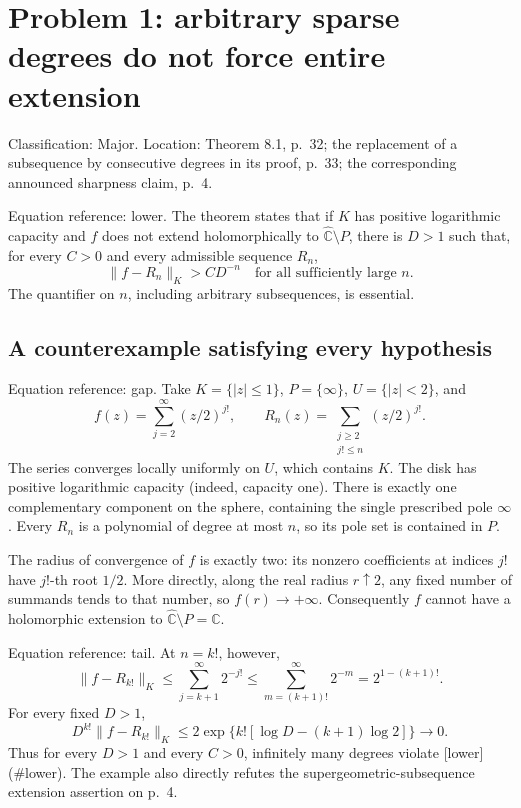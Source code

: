 \documentclass[10pt]{article}
\begin{document}
\section*{Problem 1: arbitrary sparse degrees do not force entire extension}
Classification: Major. Location: Theorem 8.1, p. 32; the replacement of a subsequence by consecutive degrees in its proof, p. 33; the corresponding announced sharpness claim, p. 4.\par
Equation reference: lower. The theorem states that if \(K\) has positive logarithmic capacity and \(f\) does not extend holomorphically to \(\widehat{\mathbb C}\setminus P\), there is \(D>1\) such that, for every \(C>0\) and every admissible sequence \(R_n\), \[
 \|f-R_n\|_K>C D^{-n}\quad\text{for all sufficiently large }n.\] The quantifier on \(n\), including arbitrary subsequences, is essential.\par
\subsection*{A counterexample satisfying every hypothesis}
Equation reference: gap. Take \(K=\{|z|\le1\}\), \(P=\{\infty\}\), \(U=\{|z|<2\}\), and \[
 f(z)=\sum_{j=2}^{\infty}(z/2)^{j!},\qquad
 R_n(z)=\sum_{\substack{j\ge2\\ j!\le n}}(z/2)^{j!}.\] The series converges locally uniformly on \(U\), which contains \(K\). The disk has positive logarithmic capacity (indeed, capacity one). There is exactly one complementary component on the sphere, containing the single prescribed pole \(\infty\). Every \(R_n\) is a polynomial of degree at most \(n\), so its pole set is contained in \(P\).\par
The radius of convergence of \(f\) is exactly two: its nonzero coefficients at indices \(j!\) have \(j!\)-th root \(1/2\). More directly, along the real radius \(r\uparrow2\), any fixed number of summands tends to that number, so \(f(r)\to+\infty\). Consequently \(f\) cannot have a holomorphic extension to \(\widehat{\mathbb C}\setminus P=\mathbb C\).\par
Equation reference: tail. At \(n=k!\), however, \[
 \|f-R_{k!}\|_K
 \le\sum_{j=k+1}^{\infty}2^{-j!}
 \le\sum_{m=(k+1)!}^{\infty}2^{-m}
 =2^{1-(k+1)!}.\] For every fixed \(D>1\), \[D^{k!}\|f-R_{k!}\|_K
 \le 2\exp\{k![\log D-(k+1)\log2]\}\longrightarrow0.\] Thus for every \(D>1\) and every \(C>0\), infinitely many degrees violate [lower] (\#lower). The example also directly refutes the supergeometric-subsequence extension assertion on p. 4.\par
\end{document}
